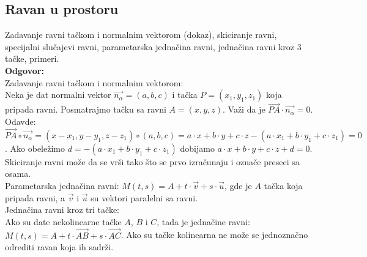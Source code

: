 \documentclass[12pt]{article}
\begin{document}
    \subsection{Ravan u prostoru}
    Zadavanje ravni tačkom i normalnim vektorom (dokaz),
    skiciranje ravni, specijalni slučajevi ravni, parametarska
    jednačina ravni, jednačina ravni kroz 3 tačke, primeri.
    \\
    \textbf{Odgovor:}\\
    Zadavanje ravni tačkom i normalnim vektorom:\\
    Neka je dat normalni vektor $\overrightarrow{n_\alpha}=(a,b,c)$
    i tačka $P=(x_1,y_1,z_1)$ koja pripada ravni.
    Posmatrajmo tačku sa ravni $A=(x,y,z)$. Važi da
    je $\overrightarrow{PA}\cdot\overrightarrow{n_\alpha}=0$.
    Odavde:
$\overrightarrow{PA}\circ\overrightarrow{n_\alpha}=(x-x_1,y-y_1,z-z_1)\circ(a,b,c)=a\cdot x+b\cdot y+c\cdot z-(a\cdot x_1+b\cdot y_1+c\cdot z_1)=0$.
    Ako obeležimo $d=-(a\cdot x_1+b\cdot y_1+c\cdot z_1)$ dobijamo $a\cdot x+b\cdot y+c\cdot z+d=0$.
    Skiciranje ravni može da se vrši tako što se prvo izračunaju i označe preseci sa osama.\\
    Parametarska jednačina ravni: $M(t,s)=A+t\cdot\overrightarrow{v}+s\cdot\overrightarrow{u}$,
    gde je $A$ tačka koja pripada ravni, a $\overrightarrow{v}$ i $\overrightarrow{u}$
    su vektori paralelni sa ravni.\\
    Jednačina ravni kroz tri tačke:\\
    Ako su date nekolinearne tačke $A$, $B$ i $C$, tada
    je jednačine ravni: $M(t,s)=A+t\cdot\overrightarrow{AB}+s\cdot\overrightarrow{AC}$.
    Ako su tačke kolinearna ne može se jednoznačno odrediti ravan koja ih sadrži.
    \par
\end{document}
